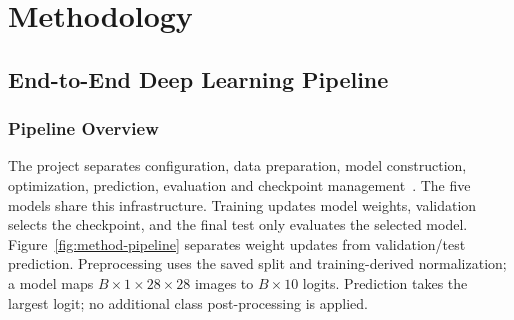 \clearpage
\section{Methodology}
\label{sec:methods}
\subsection{End-to-End Deep Learning Pipeline}
\subsubsection{Pipeline Overview}
The project separates configuration, data preparation, model construction, optimization, prediction, evaluation and checkpoint management~\cite{code}. The five models share this infrastructure. Training updates model weights, validation selects the checkpoint, and the final test only evaluates the selected model.
Figure~\ref{fig:method-pipeline} separates weight updates from validation/test prediction. Preprocessing uses the saved split and training-derived normalization; a model maps $B\times1\times28\times28$ images to $B\times10$ logits. Prediction takes the largest logit; no additional class post-processing is applied.

